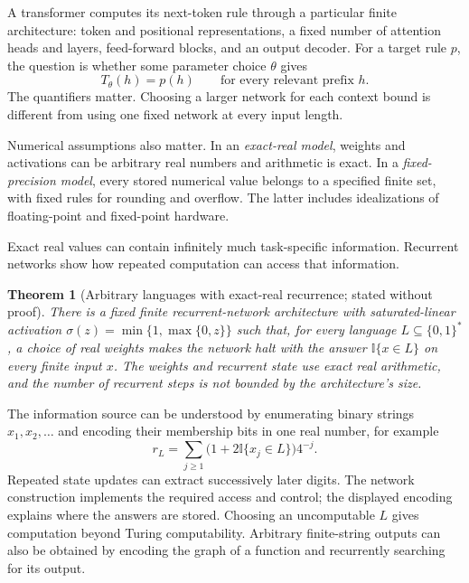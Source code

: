 \documentclass[11pt,twoside]{article}
\newcommand{\I}{\mathbb I}
\newtheorem{theorem}{Theorem}[section]
\theoremstyle{definition}
\theoremstyle{remark}
\begin{document}
A transformer computes its next-token rule through a particular finite
architecture: token and positional representations, a fixed number of
attention heads and layers, feed-forward blocks, and an output decoder.
For a target rule $p$, the question is whether some parameter choice
$\theta$ gives
\begin{equation}
 T_\theta(h)=p(h)\qquad\text{for every relevant prefix }h.
 \label{eq:represent-rule}
\end{equation}
The quantifiers matter. Choosing a larger network for each context bound
is different from using one fixed network at every input length.

Numerical assumptions also matter. In an \emph{exact-real model}, weights
and activations can be arbitrary real numbers and arithmetic is exact.
In a \emph{fixed-precision model}, every stored numerical value belongs to
a specified finite set, with fixed rules for rounding and overflow. The
latter includes idealizations of floating-point and fixed-point hardware.

Exact real values can contain infinitely much task-specific information.
Recurrent networks show how repeated computation can access that information.

\begin{theorem}[Arbitrary languages with exact-real recurrence; stated without proof]
\label{thm:real-rnn}
There is a fixed finite recurrent-network architecture with saturated-linear
activation $\sigma(z)=\min\{1,\max\{0,z\}\}$ such that, for every
language $L\subseteq\{0,1\}^*$, a choice of real weights makes the network
halt with the answer $\I\{x\in L\}$ on every finite input $x$.
The weights and recurrent state use exact real arithmetic, and the number
of recurrent steps is not bounded by the architecture's size.
\end{theorem}

The information source can be understood by enumerating binary strings
$x_1,x_2,\ldots$ and encoding their membership bits in one real number,
for example
\begin{equation}
 r_L=\sum_{j\geq1}\bigl(1+2\I\{x_j\in L\}\bigr)4^{-j}.
 \label{eq:real-advice}
\end{equation}
Repeated state updates can extract successively later digits. The
network construction implements the required access and control;
the displayed encoding explains where the answers are stored. Choosing
an uncomputable $L$ gives computation beyond Turing computability.
Arbitrary finite-string outputs can also be obtained by encoding the
graph of a function and recurrently searching for its output.\label{en:string-output}
\end{document}
